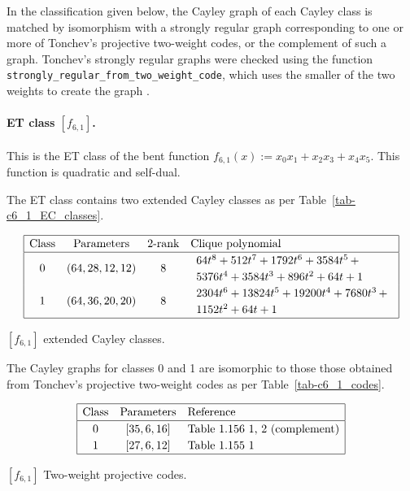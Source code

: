 In the classification given below, the Cayley graph of each Cayley class is matched by isomorphism
with a strongly regular graph corresponding to one
or more of Tonchev's projective two-weight codes, or the complement of such a graph.
Tonchev's strongly regular graphs were checked using the function
\verb!strongly_regular_from_two_weight_code!, which uses the smaller of the two weights to create the graph
\cite{SageMath7517}.
%
\paragraph*{ET class $[f_{6,1}]$.}
%
This is the ET class of the bent function
$f_{6,1}(x) := x_0 x_1 + x_2 x_3 + x_4 x_5.$
This function is quadratic and self-dual.

The ET class contains two extended Cayley classes as per Table~\ref{tab-c6_1_EC_classes}.

\begin{table}[!bhpt] %
%
\small{}
\begin{align*}
\def\arraystretch{1.2}
\begin{array}{|cccl|}
\hline
\text{Class} &
\text{Parameters} &
\text{2-rank} &
\text{Clique polynomial}
\\
\hline
0 &
(64, 28, 12, 12) &
8 &
\begin{array}{l}
64t^{8} + 512t^{7} + 1792t^{6} + 3584t^{5}
\,+
\\
 5376t^{4} + 3584t^{3} + 896t^{2} + 64t + 1
\end{array}
\\
1 &
(64, 36, 20, 20) &
8 &
\begin{array}{l}
2304t^{6} + 13824t^{5} + 19200t^{4} + 7680t^{3}
\,+
\\
 1152t^{2} + 64t + 1
\end{array}
\\
\hline
\end{array}
\end{align*}
%
\caption{$[f_{6,1}]$ extended Cayley classes.}
\label{tab-c6_1_EC_classes}
\end{table}

The Cayley graphs for classes 0 and 1 are isomorphic to those those obtained from
Tonchev's projective two-weight codes \cite{Ton07codes} as per Table~\ref{tab-c6_1_codes}.

\begin{table}[!bhpt] %
\small{
\begin{align*}
\def\arraystretch{1.2}
\begin{array}{|ccl|}
\hline
\text{Class} &
\text{Parameters} & \text{Reference}
\\
\hline
0 & [35,6,16] & \text{Table 1.156 1, 2 (complement)}
\\
1 & [27,6,12] & \text{Table 1.155 1 }
\\
\hline
\end{array}
\end{align*}
}
\caption{$[f_{6,1}]$ Two-weight projective codes.}
\label{tab-c6_1_codes}
\end{table}

